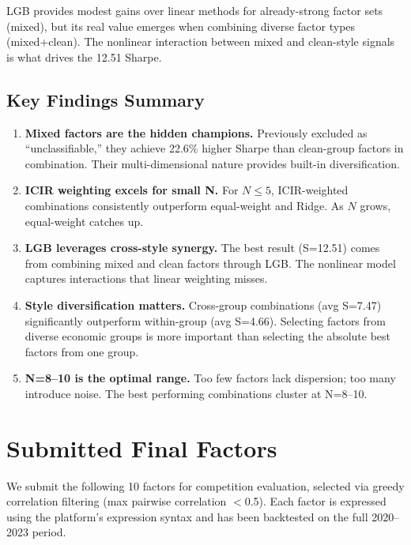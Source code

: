 \documentclass[11pt,a4paper]{ctexart}
\begin{document}
LGB provides modest gains over linear methods for already-strong factor sets (mixed), but its real value emerges when combining diverse factor types (mixed+clean). The nonlinear interaction between mixed and clean-style signals is what drives the 12.51 Sharpe.

\subsection{Key Findings Summary}

\begin{enumerate}[nosep]
    \item \textbf{Mixed factors are the hidden champions.} Previously excluded as ``unclassifiable,'' they achieve 22.6\% higher Sharpe than clean-group factors in combination. Their multi-dimensional nature provides built-in diversification.
    \item \textbf{ICIR weighting excels for small N.} For $N\leq5$, ICIR-weighted combinations consistently outperform equal-weight and Ridge. As $N$ grows, equal-weight catches up.
    \item \textbf{LGB leverages cross-style synergy.} The best result (S=12.51) comes from combining mixed and clean factors through LGB. The nonlinear model captures interactions that linear weighting misses.
    \item \textbf{Style diversification matters.} Cross-group combinations (avg S=7.47) significantly outperform within-group (avg S=4.66). Selecting factors from diverse economic groups is more important than selecting the absolute best factors from one group.
    \item \textbf{N=8--10 is the optimal range.} Too few factors lack dispersion; too many introduce noise. The best performing combinations cluster at N=8--10.
\end{enumerate}

\section{Submitted Final Factors}

We submit the following 10 factors for competition evaluation, selected via greedy correlation filtering (max pairwise correlation $<$0.5). Each factor is expressed using the platform's expression syntax and has been backtested on the full 2020--2023 period.
\end{document}
